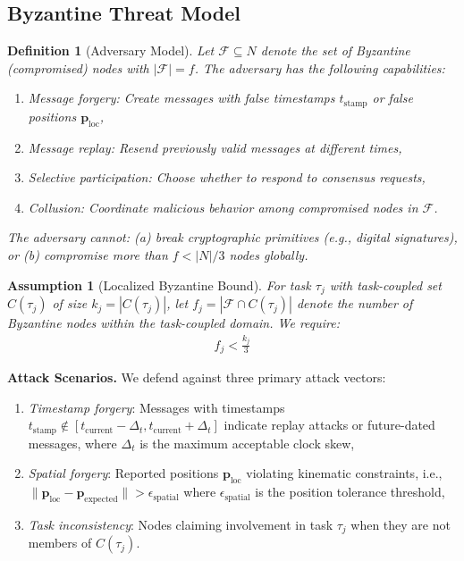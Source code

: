 \documentclass[lettersize,journal]{IEEEtran}
\newtheorem{definition}{Definition}
\newtheorem{assumption}{Assumption}
\begin{document}
\subsection{Byzantine Threat Model}

\begin{definition}[Adversary Model]
\label{def:adversary}
Let $\mathcal{F} \subseteq N$ denote the set of Byzantine (compromised) nodes with $|\mathcal{F}| = f$. The adversary has the following capabilities:
\begin{enumerate}
    \item \textit{Message forgery}: Create messages with false timestamps 
          $t_{\text{stamp}}$ or false positions $\mathbf{p}_{\text{loc}}$,
    \item \textit{Message replay}: Resend previously valid messages at 
          different times,
    \item \textit{Selective participation}: Choose whether to respond to 
          consensus requests,
    \item \textit{Collusion}: Coordinate malicious behavior among 
          compromised nodes in $\mathcal{F}$.
\end{enumerate}
The adversary \textit{cannot}: (a) break cryptographic primitives (e.g., 
digital signatures), or (b) compromise more than $f < |N|/3$ 
nodes globally.
\end{definition}

\begin{assumption}[Localized Byzantine Bound]
\label{assump:localized_bound}
For task $\tau_j$ with task-coupled set $C(\tau_j)$ of size 
$k_j = |C(\tau_j)|$, let $f_j = |\mathcal{F} \cap C(\tau_j)|$ 
denote the number of Byzantine nodes within the task-coupled domain. We 
require:
\begin{equation}
\begin{aligned}
f_j < \frac{k_j}{3}
\end{aligned}
\end{equation}
\end{assumption}

\textbf{Attack Scenarios.} We defend against three primary attack vectors:
\begin{enumerate}
    \item \textit{Timestamp forgery}: Messages with timestamps 
          $t_{\text{stamp}} \notin [t_{\text{current}} - \Delta_t, 
          t_{\text{current}} + \Delta_t]$ indicate replay attacks or 
          future-dated messages, where $\Delta_t$ is the maximum acceptable 
          clock skew,
    \item \textit{Spatial forgery}: Reported positions $\mathbf{p}_{\text{loc}}$ 
          violating kinematic constraints, i.e., 
          $\|\mathbf{p}_{\text{loc}} - \mathbf{p}_{\text{expected}}\| > 
          \epsilon_{\text{spatial}}$ where $\epsilon_{\text{spatial}}$ is 
          the position tolerance threshold,
    \item \textit{Task inconsistency}: Nodes claiming involvement in task $\tau_j$ when they are not members of $C(\tau_j)$.
\end{enumerate}
\end{document}
